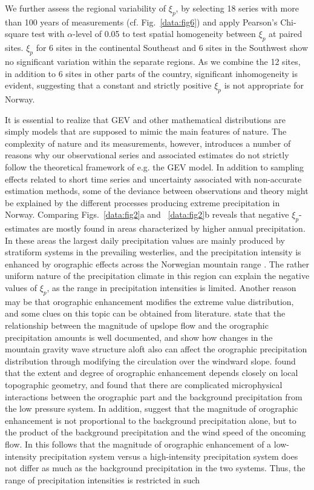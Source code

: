 \documentclass[12pt,a4paper,english]{article}
\begin{document}
We further assess the regional variability of $\xi_{p}$, by selecting 18 series with more than 100 years of measurements (cf. Fig.~\ref{data:fig6}) and apply Pearson's Chi-square test \citep{Pearson1900} with $\alpha$-level of 0.05 to test spatial homogeneity between $\xi_{p}$ at paired sites. $\xi_{p}$ for 6 sites in the continental Southeast and 6 sites in the Southwest show no significant variation within the separate regions. As we combine the 12 sites, in addition to 6 sites in other parts of the country, significant inhomogeneity is evident, suggesting that a constant and strictly positive $\xi_{p}$ is not appropriate for Norway.

It is essential to realize that GEV and other mathematical distributions are simply models that are supposed to mimic the main features of nature. The complexity of nature and its measurements, however, introduces a number of reasons why our observational series and associated estimates do not strictly follow the theoretical framework of e.g. the GEV model. In addition to sampling effects related to short time series and uncertainty associated with non-accurate estimation methods, some of the deviance between observations and theory might be explained by the different processes producing extreme precipitation in Norway. Comparing Figs.~\ref{data:fig2}a and ~\ref{data:fig2}b reveals that negative $\xi_{p}$-estimates are mostly found in areas characterized by higher annual precipitation. In these areas the largest daily precipitation values are mainly produced by stratiform systems in the prevailing westerlies, and the precipitation intensity is enhanced by orographic effects across the Norwegian mountain range \citep{Andersen1973, Andersen1975,Barstad2002, CarolettiandBarstad2010}. The rather uniform nature of the precipitation climate in this region can explain the negative values of $\xi_{p}$, as the range in precipitation intensities is limited. Another reason may be that orographic enhancement \citep{Roe2005} modifies the extreme value distribution, and some clues on this topic can be obtained from literature. \cite{Colle2004} state that the relationship between the magnitude of upslope flow and the orographic precipitation amounts is well documented, and show how changes in the mountain gravity wave structure aloft also can affect the orographic precipitation distribution through modifying the circulation over the windward slope. \cite{Blumen1990, YuandCheng2013} found that the extent and degree of orographic enhancement depends closely on local topographic geometry, and \cite{YuandCheng2008, YuandCheng2013} found that there are complicated microphysical interactions between the orographic part and the background precipitation from the low pressure system. In addition, \cite{YuandCheng2013} suggest that the magnitude of orographic enhancement is not proportional to the background precipitation alone, but to the product of the background precipitation and the wind speed of the oncoming flow. In this follows that the magnitude of orographic enhancement of a low-intensity precipitation system versus a high-intensity precipitation system does not differ as much as the background precipitation in the two systems. Thus, the range of precipitation intensities is restricted in such 
\end{document}
